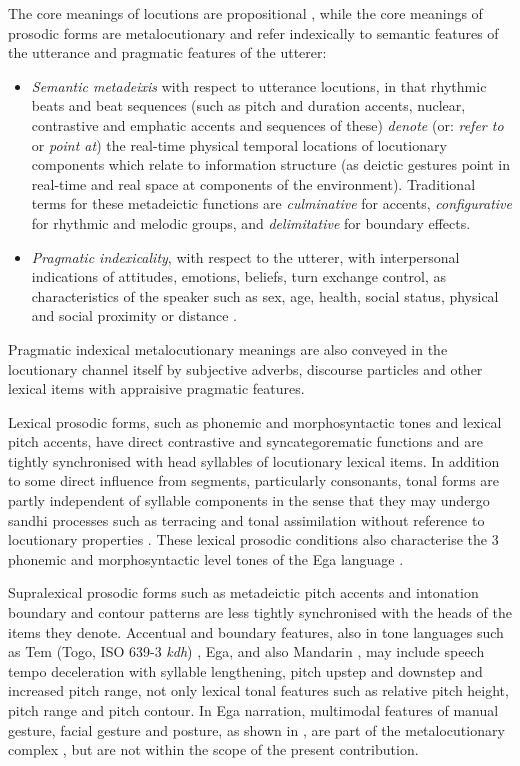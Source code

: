 \documentclass[output=paper,colorlinks,citecolor=brown]{langscibook}
\begin{document}
The core meanings of locutions are propositional \citep{Austin1962}, while the core meanings of prosodic forms are metalocutionary \citep{gibbon1976, gibbonmetalocution1981} and refer indexically to semantic features of the utterance and pragmatic features of the utterer:
\begin{itemize}
\item \textit{Semantic metadeixis} with respect to utterance locutions, in that rhythmic beats and beat sequences (such as pitch and duration accents, nuclear, contrastive and emphatic accents and sequences of these) \textit{denote} (or: \textit{refer to} or \textit{point at}) the real-time physical temporal locations of locutionary components which relate to information structure (as deictic gestures point in real-time and real space at components of the environment). Traditional terms for these metadeictic functions are \textit{culminative} for accents, \textit{configurative} for rhythmic and melodic groups, and \textit{delimitative} for boundary effects.
\item \textit{Pragmatic indexicality}, with respect to the utterer, with interpersonal indications of attitudes, emotions, beliefs, turn exchange control, as characteristics of the speaker such as sex, age, health, social status, physical and social proximity or distance \citep{gibbon1976, hirschbergpierrehumbert1986}.
\end{itemize}
Pragmatic indexical metalocutionary meanings are also conveyed in the locutionary channel itself by subjective adverbs, discourse particles and other lexical items with appraisive pragmatic features.

Lexical prosodic forms, such as phonemic and morphosyntactic tones and lexical pitch accents, have direct contrastive and syncategorematic functions and are tightly synchronised with head syllables of locutionary lexical items. In addition to some direct influence from segments, particularly consonants, tonal forms are partly independent of syllable components in the sense that they may undergo sandhi processes such as terracing and tonal assimilation without reference to locutionary properties \citep{gibbonfstone1987, jansche1998}. These lexical prosodic conditions also characterise the 3 phonemic and morphosyntactic level tones of the Ega language \citep{connellahouagibbon2002}.

Supralexical prosodic forms such as metadeictic pitch accents and intonation boundary and contour patterns are less tightly synchronised with the heads of the items they denote. Accentual and boundary features, also in tone languages such as Tem (Togo, ISO 639-3 \textit{kdh}) \citep{tchagbale2001}, Ega, and also Mandarin \citep{duanmu2007}, may include speech tempo deceleration with syllable lengthening, pitch upstep and downstep and increased pitch range, not only lexical tonal features such as relative pitch height, pitch range and pitch contour. In Ega narration, multimodal features of manual gesture, facial gesture and posture, as shown in , are part of the metalocutionary complex \citep{rossinigibbon2011}, but are not within the scope of the present contribution.
\end{document}
